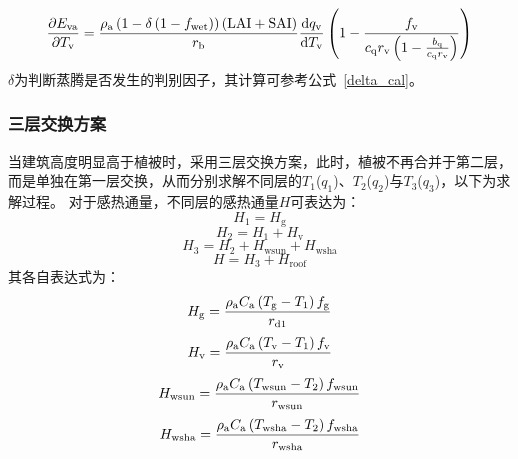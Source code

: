 %
\begin{equation}
  \frac{\partial  E_{\mathrm{va}}}{\partial T_{\mathrm{v}}} = \frac{\rho _{\rm a} \left(1-\delta\left(1-f_{\mathrm{wet}}\right)\right)\left({\rm LAI} + {\rm SAI}\right)}{r_{\mathrm{b}}} \frac{{\mathrm {d}} q_{\mathrm{v}}}{{\mathrm {d}} T_{\mathrm{v}}} \left(1-\frac{f_{\mathrm{v}}}{c_{\mathrm{q}} r_{\mathrm{v}}\left(1-\frac{b_{\mathrm{q}}}{c_{\mathrm{q}} r_{\mathrm{v}}}\right)}\right)
\end{equation}
$\delta$为判断蒸腾是否发生的判别因子，其计算可参考公式~\eqref{delta_cal}。
%
%
\subsubsection{三层交换方案}
当建筑高度明显高于植被时，采用三层交换方案，此时，植被不再合并于第二层，而是单独在第一层交换，从而分别求解不同层的$T_{1}$($q_{1}$)、$T_{2}$($q_{2}$)与$T_{3}$($q_{3}$)，以下为求解过程。
对于感热通量，不同层的感热通量$H$可表达为：
%
\begin{equation}
  \label{3lay_H1_veg}
  H_{1} = H_{\mathrm{g}}
\end{equation}
%
\begin{equation}
  H_{2} = H_{1}+H_{\mathrm{v}}
\end{equation}
%
\begin{equation}
  H_{3} = H_{2}+H_{\mathrm{wsun}}+H_{\mathrm{wsha}}
\end{equation}
%
\begin{equation}
  \label{3lay_H3_veg}
  H = H_{3}+H_{\mathrm{roof}}
\end{equation}
其各自表达式为：
\begin{equation}\label{urban_Hg_3_veg}
  H_{\mathrm{g}} = \frac{\rho _{\rm a} C_{\mathrm a} \left( T_{\mathrm{g}} - T_{1} \right) f_{\mathrm{g}}}{r_{\mathrm{d1}}}
\end{equation}
%
\begin{equation}
  H_{\mathrm{v}} = \frac{\rho _{\rm a} C_{\mathrm a} \left( T_{\mathrm{v}} - T_{1} \right) f_{\rm v}}{r_{\mathrm{v}}}
\end{equation}
%
\begin{equation}
  H_{\mathrm{wsun}} = \frac{\rho  _{\rm a} C_{\mathrm a} \left( T_{\mathrm{wsun}} - T_{2} \right) f_{\mathrm{wsun}}}{r_{\mathrm{wsun}}}
\end{equation}
%
\begin{equation}
  H_{\mathrm{wsha}} = \frac{\rho _{\rm a} C_{\mathrm a} \left( T_{\mathrm{wsha}} - T_{2} \right) f_{\mathrm{wsha}}}{r_{\mathrm{wsha}}}
\end{equation}
